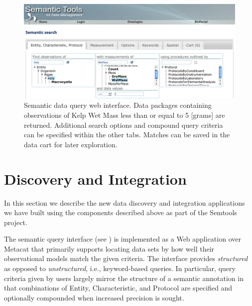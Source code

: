 \begin{figure}[!t]
\centering
\includegraphics[width=1.0\textwidth]{images/metacat-query.png}
\caption{Semantic data query web interface. Data packages containing observations of Kelp Wet Mass less than or equal to 5 [grams] are returned. Additional search options and compound query criteria can be specified within the other tabs. Matches can be saved in the data cart for later exploration.}
\label{fig:metacat-query}
\end{figure}


\section{Discovery and Integration}
\label{sec:application}

In this section we describe the new data discovery and integration
applications we have built using the components described above as
part of the Semtools project.

 The semantic query interface (see
) is implemented as a Web application over
Metacat that primarily supports locating data sets by how well their
observational models match the given criteria. The interface provides
\emph{structured} as opposed to \emph{unstructured}, i.e.,
keyword-based queries. In particular, query criteria given by users
largely mirror the structure of a semantic annotation in that
combinations of Entity, Characteristic, and Protocol are specified and
optionally compounded when increased precision is sought.

